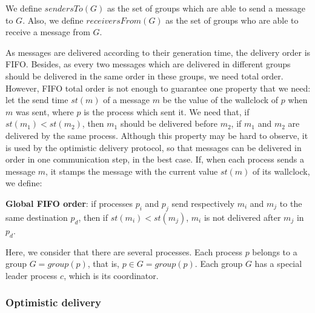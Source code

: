 \documentclass[times, 10pt]{article}
\begin{document}
We define $sendersTo(G)$ as the set of groups which are able to send a message to $G$. Also, we define $receiversFrom(G)$ as the set of groups who are able to receive a message from $G$.

As messages are delivered according to their generation time, the delivery order is FIFO. Besides, as every two messages which are delivered in different groups should be delivered in the same order in these groups, we need total order. However, FIFO total order is not enough to guarantee one property that we need: let the send time $st(m)$ of a message $m$ be the value of the wallclock of $p$ when $m$ was sent, where $p$ is the process which sent it. We need that, if $st(m_1) < st(m_2)$, then $m_1$ should be delivered before $m_2$, if $m_1$ and $m_2$ are delivered by the same process. Although this property may be hard to observe, it is used by the optimistic delivery protocol, so that messages can be delivered in order in one communication step, in the best case. If, when each process sends a message $m$, it stamps the message with the current value $st(m)$ of its wallclock, we define:

\textbf{Global FIFO order}: if processes $p_i$ and $p_j$ send respectively $m_i$ and $m_j$ to the same destination $p_d$, then if $st(m_i) < st(m_j)$, $m_i$ is not delivered after $m_j$ in $p_d$.

Here, we consider that there are several processes. Each process $p$ belongs to a group $G = group(p)$, that is, $p \in G = group(p)$. Each group $G$ has a special leader process $c$, which is its coordinator. 

\subsubsection{Optimistic delivery}

\end{document}
